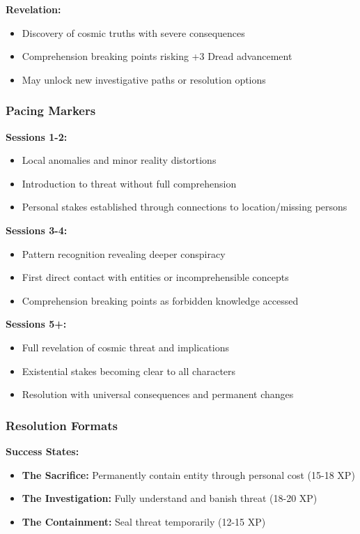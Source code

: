 \documentclass[11pt]{article}
\begin{document}
\textbf{Revelation:}
\begin{itemize}
\item Discovery of cosmic truths with severe consequences
\item Comprehension breaking points risking +3 Dread advancement
\item May unlock new investigative paths or resolution options
\end{itemize}

\subsubsection{Pacing Markers}

\textbf{Sessions 1-2:}
\begin{itemize}
\item Local anomalies and minor reality distortions
\item Introduction to threat without full comprehension
\item Personal stakes established through connections to location/missing persons
\end{itemize}

\textbf{Sessions 3-4:}
\begin{itemize}
\item Pattern recognition revealing deeper conspiracy
\item First direct contact with entities or incomprehensible concepts
\item Comprehension breaking points as forbidden knowledge accessed
\end{itemize}

\textbf{Sessions 5+:}
\begin{itemize}
\item Full revelation of cosmic threat and implications
\item Existential stakes becoming clear to all characters
\item Resolution with universal consequences and permanent changes
\end{itemize}

\subsubsection{Resolution Formats}

\textbf{Success States:}
\begin{itemize}
\item \textbf{The Sacrifice:} Permanently contain entity through personal cost (15-18 XP)
\item \textbf{The Investigation:} Fully understand and banish threat (18-20 XP)
\item \textbf{The Containment:} Seal threat temporarily (12-15 XP)
\end{itemize}
\end{document}
